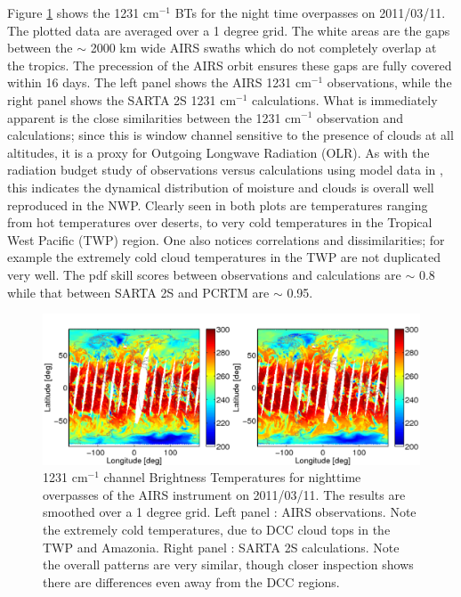 \documentclass[agupp]{aguplus}              %
\newcommand{\wn}{cm$^{-1}$\xspace}
\begin{document}
\begin{article}
Figure \ref{bt1231_obs_sartaslab} shows the 1231 \wn BTs for the night
time overpasses on 2011/03/11. The plotted data are averaged over a 1
degree grid. The white areas are the gaps between the $\sim$ 2000 km
wide AIRS swaths which do not completely overlap at the tropics.  The
precession of the AIRS orbit ensures these gaps are fully covered
within 16 days.  The left panel shows the AIRS 1231 \wn observations,
while the right panel shows the SARTA 2S 1231 \wn calculations. What
is immediately apparent is the close similarities between the 1231 \wn
observation and calculations; since this is window channel sensitive
to the presence of clouds at all altitudes, it is a proxy for Outgoing
Longwave Radiation (OLR). As with the radiation budget study of
observations versus calculations using model data in \citep{all:05},
this indicates the dynamical distribution of moisture and clouds is
overall well reproduced in the NWP.  Clearly seen in both plots are
temperatures ranging from hot temperatures over deserts, to very cold
temperatures in the Tropical West Pacific (TWP) region. One also
notices correlations and dissimilarities; for example the extremely
cold cloud temperatures in the TWP are not duplicated very well. The
pdf skill scores between observations and calculations are $\sim$ 0.8
while that between SARTA 2S and PCRTM are $\sim$ 0.95.

\begin{figure} \center
\noindent\includegraphics[width=\textwidth]{FIGS/bt1231_obs_sartaslabV2.pdf}
\caption{1231 \wn channel Brightness Temperatures for nighttime
              overpasses of the AIRS instrument on 2011/03/11. The results are
              smoothed over a 1 degree grid. Left panel : AIRS observations. Note the 
              extremely cold temperatures, due to DCC cloud tops in the TWP and Amazonia. 
              Right panel : SARTA 2S calculations. Note the overall patterns
              are very similar, though closer inspection shows there are differences even away
              from the DCC regions.}
\label{bt1231_obs_sartaslab}
\end{figure}



\end{article}
\end{document}
